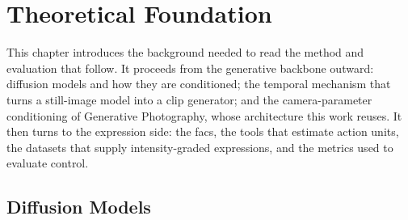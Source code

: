 \chapter{Theoretical Foundation}\label{cap:background}
\glsresetall

%
%

This chapter introduces the background needed to read the method and evaluation that follow. It proceeds from the generative backbone outward: diffusion models and how they are conditioned;
the temporal mechanism that turns a still-image model into a clip generator; and the camera-parameter conditioning of Generative Photography, whose architecture this work reuses. It then turns to the expression side: the \gls{facs}, the tools that
estimate action units, the datasets that supply
intensity-graded expressions, and the metrics used to evaluate
control.

\section{Diffusion Models}\label{sec:bg-diffusion}


